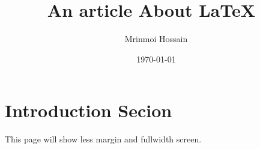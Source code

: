 \documentclass[11pt]{article}
\begin{document}
\title{An article About \LaTeX\ }
\author{Mrinmoi Hossain}
\date{\today}
\maketitle

\section{Introduction Secion} This page will show less margin and fullwidth screen.
\end{document}
